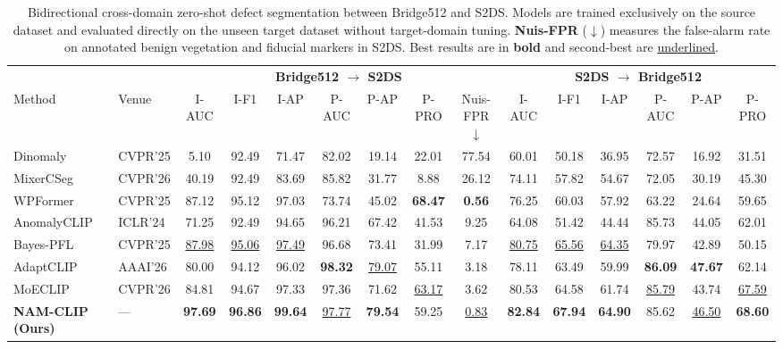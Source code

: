 \documentclass[conference]{IEEEtran}
\newcommand{\method}{NAM-CLIP}
\begin{document}
\begin{table}[t]
\centering
\caption{Bidirectional cross-domain zero-shot defect segmentation between Bridge512 and S2DS. Models are trained exclusively on the source dataset and evaluated directly on the unseen target dataset without target-domain tuning. \textbf{Nuis-FPR} ($\downarrow$) measures the false-alarm rate on annotated benign vegetation and fiducial markers in S2DS. Best results are in \textbf{bold} and second-best are \underline{underlined}.}
\label{tab:cross_domain}
\footnotesize
\setlength{\tabcolsep}{4.4pt}
\begin{tabular}{l l ccccccc cccccc}
\toprule
& & \multicolumn{7}{c}{\textbf{Bridge512 $\rightarrow$ S2DS}} & \multicolumn{6}{c}{\textbf{S2DS $\rightarrow$ Bridge512}} \\
\cmidrule(lr){3-9} \cmidrule(lr){10-15}
Method & Venue & I-AUC & I-F1 & I-AP & P-AUC & P-AP & P-PRO & Nuis-FPR$\downarrow$ & I-AUC & I-F1 & I-AP & P-AUC & P-AP & P-PRO \\
\midrule
Dinomaly~\cite{guo2025dinomaly} & CVPR'25 & 5.10 & 92.49 & 71.47 & 82.02 & 19.14 & 22.01 & 77.54 & 60.01 & 50.18 & 36.95 & 72.57 & 16.92 & 31.51 \\
MixerCSeg~\cite{zhao2026mixercseg} & CVPR'26 & 40.19 & 92.49 & 83.69 & 85.82 & 31.77 & 8.88 & 26.12 & 74.11 & 57.82 & 54.67 & 72.05 & 30.19 & 45.30 \\
WPFormer~\cite{yan2025wpformer} & CVPR'25 & 87.12 & 95.12 & 97.03 & 73.74 & 45.02 & \textbf{68.47} & \textbf{0.56} & 76.25 & 60.03 & 57.92 & 63.22 & 24.64 & 59.65 \\
AnomalyCLIP~\cite{zhou2024anomalyclip} & ICLR'24 & 71.25 & 92.49 & 94.65 & 96.21 & 67.42 & 41.53 & 9.25 & 64.08 & 51.42 & 44.44 & 85.73 & 44.05 & 62.01 \\
Bayes-PFL~\cite{qu2025bayespfl} & CVPR'25 & \underline{87.98} & \underline{95.06} & \underline{97.49} & 96.68 & 73.41 & 31.99 & 7.17 & \underline{80.75} & \underline{65.56} & \underline{64.35} & 79.97 & 42.89 & 50.15 \\
AdaptCLIP~\cite{gao2026adaptclip} & AAAI'26 & 80.00 & 94.12 & 96.02 & \textbf{98.32} & \underline{79.07} & 55.11 & 3.18 & 78.11 & 63.49 & 59.99 & \textbf{86.09} & \textbf{47.67} & 62.14 \\
MoECLIP~\cite{park2026moeclip} & CVPR'26 & 84.81 & 94.67 & 97.33 & 97.36 & 71.62 & \underline{63.17} & 3.62 & 80.53 & 64.58 & 61.74 & \underline{85.79} & 43.74 & \underline{67.59} \\
\midrule
\textbf{\method{} (Ours)} & --- & \textbf{97.69} & \textbf{96.86} & \textbf{99.64} & \underline{97.77} & \textbf{79.54} & 59.25 & \underline{0.83} & \textbf{82.84} & \textbf{67.94} & \textbf{64.90} & 85.62 & \underline{46.50} & \textbf{68.60} \\
\bottomrule
\end{tabular}
\end{table}
\end{document}
